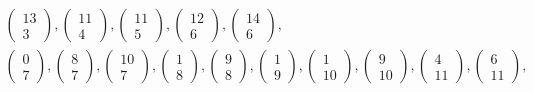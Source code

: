 \documentclass[12pt]{amsart}
\begin{document}
\begin{exo}[label={exo:HV-dominoes}]
\[\begin{array}{l}
\left(\begin{smallmatrix}13 \\ 3 \end{smallmatrix}\right),
\left(\begin{smallmatrix}11 \\ 4 \end{smallmatrix}\right),
\left(\begin{smallmatrix}11 \\ 5 \end{smallmatrix}\right),
\left(\begin{smallmatrix}12 \\ 6 \end{smallmatrix}\right),
\left(\begin{smallmatrix}14 \\ 6 \end{smallmatrix}\right),\\
\left(\begin{smallmatrix}0  \\ 7 \end{smallmatrix}\right),
\left(\begin{smallmatrix}8  \\ 7 \end{smallmatrix}\right),
\left(\begin{smallmatrix}10 \\ 7 \end{smallmatrix}\right),
\left(\begin{smallmatrix}1  \\ 8 \end{smallmatrix}\right),
\left(\begin{smallmatrix}9  \\ 8 \end{smallmatrix}\right),
\left(\begin{smallmatrix}1  \\ 9 \end{smallmatrix}\right),
\left(\begin{smallmatrix}1  \\ 10\end{smallmatrix}\right),
\left(\begin{smallmatrix}9  \\ 10\end{smallmatrix}\right),
\left(\begin{smallmatrix}4  \\ 11\end{smallmatrix}\right),
\left(\begin{smallmatrix}6  \\ 11\end{smallmatrix}\right),\\

\end{array}\]
\end{exo}
\end{document}
